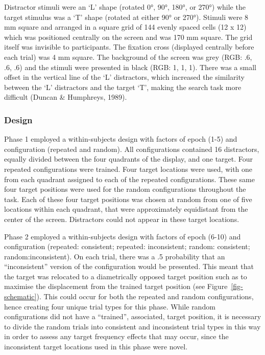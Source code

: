 \documentclass[
  man,
  floatsintext,
  longtable,
  nolmodern,
  notxfonts,
  notimes,
  colorlinks=true,linkcolor=blue,citecolor=blue,urlcolor=blue]{apa7}
\begin{document}
Distractor stimuli were an `L' shape (rotated 0°, 90°, 180°, or 270°)
while the target stimulus was a `T' shape (rotated at either 90° or
270°). Stimuli were 8 mm square and arranged in a square grid of 144
evenly spaced cells (12 x 12) which was positioned centrally on the
screen and was 170 mm square. The grid itself was invisible to
participants. The fixation cross (displayed centrally before each trial)
was 4 mm square. The background of the screen was grey (RGB: .6, .6, .6)
and the stimuli were presented in black (RGB: 1, 1, 1). There was a
small offset in the vertical line of the `L' distractors, which
increased the similarity between the `L' distractors and the target `T',
making the search task more difficult (Duncan \& Humphreys, 1989).

\subsubsection{Design}\label{design}

Phase 1 employed a within-subjects design with factors of epoch (1-5)
and configuration (repeated and random). All configurations contained 16
distractors, equally divided between the four quadrants of the display,
and one target. Four repeated configurations were trained. Four target
locations were used, with one from each quadrant assigned to each of the
repeated configurations. These same four target positions were used for
the random configurations throughout the task. Each of these four target
positions was chosen at random from one of five locations within each
quadrant, that were approximately equidistant from the center of the
screen. Distractors could not appear in these target locations.

Phase 2 employed a within-subjects design with factors of epoch (6-10)
and configuration (repeated: consistent; repeated: inconsistent; random:
consistent; random:inconsistent). On each trial, there was a .5
probability that an ``inconsistent'' version of the configuration would
be presented. This meant that the target was relocated to a
diametrically opposed target position such as to maximise the
displacement from the trained target position (see
Figure~\ref{fig-schematic}). This could occur for both the repeated and
random configurations, hence creating four unique trial types for this
phase. While random configurations did not have a ``trained'',
associated, target position, it is necessary to divide the random trials
into consistent and inconsistent trial types in this way in order to
assess any target frequency effects that may occur, since the
inconsistent target locations used in this phase were novel.
\end{document}
